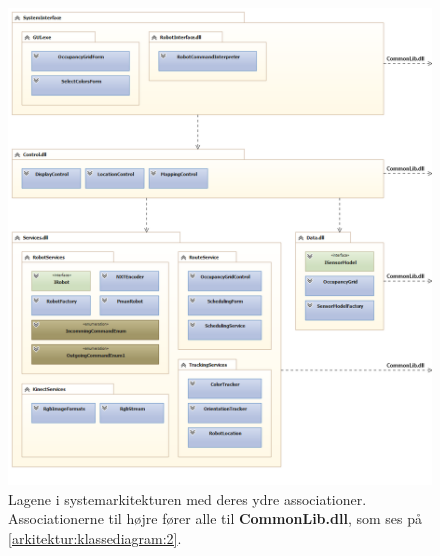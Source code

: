 \begin{figure}
\centering
\includegraphics[width=1\textwidth]{./graphics/systemarkitektur_1}
\caption{Lagene i systemarkitekturen med deres ydre associationer. Associationerne til højre fører alle til \textbf{CommonLib.dll}, som ses på \cref{arkitektur:klassediagram:2}.}
\label{arkitektur:klassediagram:1}
\end{figure}

